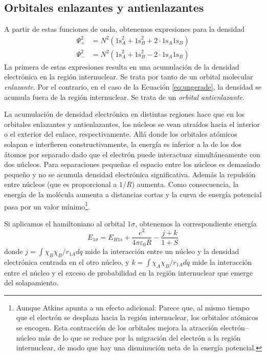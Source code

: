 \documentclass{tufte-handout}
\begin{document}
\subsection{Orbitales enlazantes y antienlazantes}
A partir de estas funciones de onda, obtenemos expresiones 
para la densidad
\begin{align}
    \Psi^2_+ &= N^2(\mathrm{1s}^2_A+\mathrm{1s}^2_B+2\cdot \mathrm{1s}_A\mathrm{1s}_B)\\
    \Psi^2_- &= N^2(\mathrm{1s}^2_A+\mathrm{1s}^2_B-2\cdot \mathrm{1s}_A\mathrm{1s}_B) 
    \label{eq:ungerade}
\end{align}
La primera de estas expresiones resulta en una acumulación
de la densidad electrónica en la región internuclear. 
Se
trata por tanto de un orbital molecular \textit{enlazante}.
Por el contrario, en el caso de la Ecuación \ref{eq:ungerade}, 
la densidad se acumula fuera de la región internuclear. Se
trata de un \textit{orbital antienlazante}. 

La acumulación de densidad electrónica en distintas regiones hace que en los orbitales enlazantes y antienlazantes, los 
núcleos se vean atraídos hacia el interior o el exterior del
enlace, respectivamente. 
Allá donde los orbitales atómicos solapan e interfieren constructivamente, la energía es inferior a la de los dos átomos por separado dado que el electrón puede interactuar simultáneamente con dos núcleos.
Para separaciones pequeñas el espacio  entre los núcleos es demasiado pequeño y no se acumula densidad electrónica significativa. 
Además la repulsión entre núcleos (que es proporcional a $1/R$) aumenta.
Como consecuencia, la energía de la molécula aumenta a  distancias cortas y la curva de energía potencial pasa por un valor mínimo\footnote{Aunque Atkins apunta a un efecto adicional: Parece que, al mismo tiempo que el electrón se desplaza hacia la región internuclear, los orbitales atómicos se encogen. Esta contracción de los orbitales mejora la atracción electrón–núcleo más de lo que se reduce por la migración del electrón a la región internuclear, de modo que hay una disminución neta de la energía potencial.}. 

Si aplicamos el hamiltoniano al orbital 1$\sigma$, obtenemos la correspondiente energía  
\begin{equation}
    E_{1\sigma}=E_{H1s} + \frac{e^2}{4\pi\varepsilon_0R}
    -\frac{j+k}{1+S}\label{eq:ener_1sigma}
\end{equation}
donde $j=\int \chi_B\chi_B/r_{1A} dq$ mide la interacción entre un núcleo y la densidad  electrónica centrada en el otro núcleo, y 
$k=\int \chi_A\chi_B/r_{1A}dq$
mide la interacción entre el núcleo y el exceso de probabilidad en la región internuclear que emerge del solapamiento. 
\end{document}
